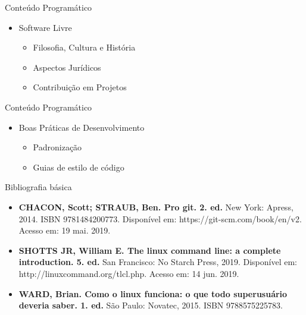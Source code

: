 \documentclass{beamer}
\begin{document}
\begin{frame}{Conteúdo Programático}\justifying
      \begin{itemize}
            \item Software Livre
            \begin{itemize}
                  \item Filosofia, Cultura e História
                  \item Aspectos Jurídicos
                  \item Contribuição em Projetos
            \end{itemize}
           
      \end{itemize}
\end{frame}
\begin{frame}{Conteúdo Programático}\justifying
      \begin{itemize}
            \item Boas Práticas de Desenvolvimento
            \begin{itemize}
                  \item Padronização
                  \item Guias de estilo de código
            \end{itemize}
           
      \end{itemize}
\end{frame}

\begin{frame}{Bibliografia básica}\justifying
      \begin{itemize}
            \item \textbf{CHACON, Scott; STRAUB, Ben.  \textcolor{sintefdarkgreen}{Pro git. 2. ed.}} New York: Apress, 2014. ISBN 9781484200773. Disponível em: https://git-scm.com/book/en/v2. Acesso em: 19 mai. 2019.
            \item \textbf{SHOTTS JR, William E. \textcolor{sintefdarkgreen}{The linux command line: a complete introduction. 5. ed.}} San Francisco: No Starch Press, 2019. Disponível em: http://linuxcommand.org/tlcl.php. Acesso em: 14 jun. 2019.
            \item \textbf{WARD, Brian. \textcolor{sintefdarkgreen}{ Como o linux funciona: o que todo superusuário deveria saber. 1. ed.}} São Paulo: Novatec, 2015. ISBN 9788575225783.         
      \end{itemize}
\end{frame}
      
\end{document}
